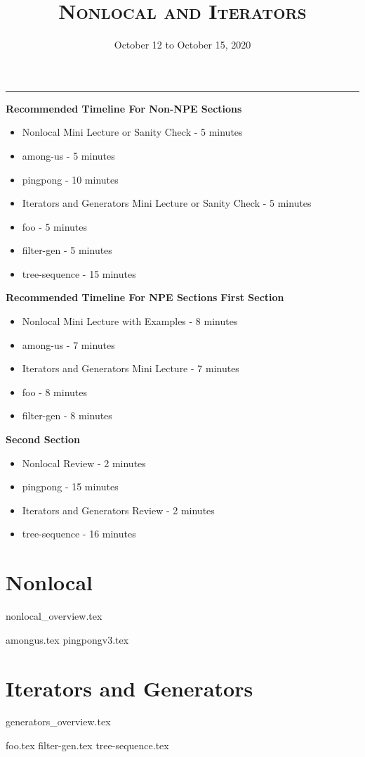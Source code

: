 \documentclass{exam}
\title{\textsc{Nonlocal and Iterators}}
\date{October 12 to October 15, 2020}
\begin{document}
\maketitle
\rule{\textwidth}{0.15em}
\fontsize{12}{15}\selectfont

\begin{guide}
\textbf{Recommended Timeline For Non-NPE Sections}
\begin{itemize}
    \item Nonlocal Mini Lecture or Sanity Check - 5 minutes
    \item among-us - 5 minutes
    \item pingpong - 10 minutes
    \item Iterators and Generators Mini Lecture or Sanity Check - 5 minutes
    \item foo - 5 minutes
    \item filter-gen - 5 minutes
    \item tree-sequence - 15 minutes
\end{itemize}
\textbf{Recommended Timeline For NPE Sections}
\textbf{First Section}
\begin{itemize}
    \item Nonlocal Mini Lecture with Examples - 8 minutes
    \item among-us - 7 minutes
    \item Iterators and Generators Mini Lecture - 7 minutes
    \item foo - 8 minutes
    \item filter-gen - 8 minutes
\end{itemize}
\textbf{Second Section}
\begin{itemize}
    \item Nonlocal Review - 2 minutes
    \item pingpong - 15 minutes
    \item Iterators and Generators Review - 2 minutes
    \item tree-sequence - 16 minutes
\end{itemize}
\end{guide}

\section{Nonlocal}
{nonlocal_overview.tex}
\begin{questions}
{amongus.tex}
{pingpongv3.tex}
\end{questions}
\vspace{-4em}
\section{Iterators and Generators}
{generators_overview.tex}
\begin{questions}
{foo.tex}
{filter-gen.tex}
{tree-sequence.tex}
\end{questions}
\end{document}
